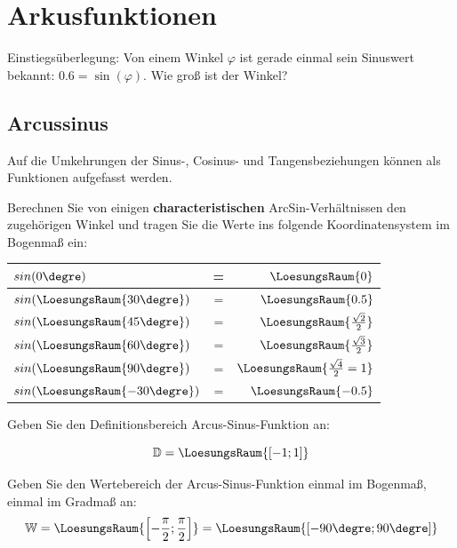 
\section{Arkusfunktionen}

Einstiegsüberlegung: Von einem Winkel $\varphi$ ist gerade einmal sein Sinuswert bekannt: $0.6 = \sin(\varphi)$. Wie groß ist der Winkel?

\trigsysDsin{}


\newpage



\subsection{Arcussinus}
Auf die Umkehrungen der Sinus-, Cosinus- und Tangensbeziehungen können
als Funktionen aufgefasst werden.

Berechnen Sie von einigen \textbf{characteristischen}
ArcSin-Verhältnissen den zugehörigen Winkel und tragen Sie die Werte ins folgende
Koordinatensystem im Bogenmaß ein:

\begin{tabular}{l|c|r}
$sin(0\degre)$ &=& $\LoesungsRaum{0}$\\\hline
$sin(\LoesungsRaum{30\degre})$ &=& $\LoesungsRaum{0.5}$\\\hline
$sin(\LoesungsRaum{45\degre})$ &=& $\LoesungsRaum{\frac{\sqrt{2}}{2}}$\\\hline
$sin(\LoesungsRaum{60\degre})$ &=& $\LoesungsRaum{\frac{\sqrt{3}}{2}}$\\\hline
$sin(\LoesungsRaum{90\degre})$ &=& $\LoesungsRaum{\frac{\sqrt{4}}{2} = 1}$\\\hline
$sin(\LoesungsRaum{-30\degre})$ &=& $\LoesungsRaum{-0.5}$
\end{tabular}


Geben Sie den Definitionsbereich Arcus-Sinus-Funktion an:

$$\mathbb{D} = \LoesungsRaum{\left[-1; 1\right]}$$

Geben Sie den Wertebereich der Arcus-Sinus-Funktion einmal im Bogenmaß,
einmal im Gradmaß an:
$$\mathbb{W} = \LoesungsRaum{\left[-\frac{\pi}{2}; \frac{\pi}{2}\right]}  =  \LoesungsRaum{[-90\degre; 90\degre]}$$


